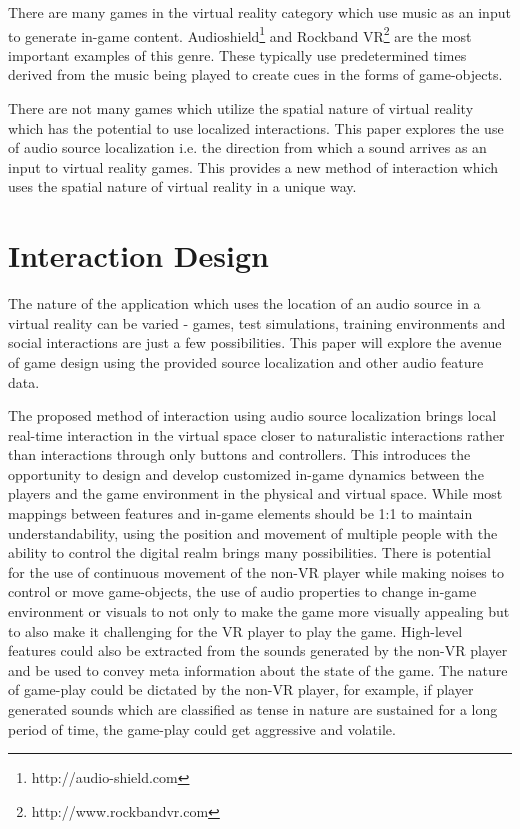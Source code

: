 \documentclass[convention]{aesconf}
\begin{document}
There are many games in the virtual reality category which use music as an input to generate in-game content. Audioshield\footnote{http://audio-shield.com} and Rockband VR\footnote{http://www.rockbandvr.com} are the most important examples of this genre. These typically use predetermined times derived from the music being played to create cues in the forms of game-objects.

There are not many games which utilize the spatial nature of virtual reality which has the potential to use localized interactions. This paper explores the use of audio source localization i.e. the direction from which a sound arrives as an input to virtual reality games. This provides a new method of interaction which uses the spatial nature of virtual reality in a unique way. 

\section{Interaction Design}
The nature of the application which uses the location of an audio source in a virtual reality can be varied - games, test simulations, training environments and social interactions are just a few possibilities. This paper will explore the avenue of game design using the provided source localization and other audio feature data.

The proposed method of interaction using audio source localization brings local real-time interaction in the virtual space closer to naturalistic interactions rather than interactions through only buttons and controllers. This introduces the opportunity to design and develop customized in-game dynamics between the players and the game environment in the physical and virtual space. While most mappings between features and in-game elements should be 1:1 to maintain understandability, using the position and movement of multiple people with the ability to control the digital realm brings many possibilities. There is potential for the use of continuous movement of the non-VR player while making noises to control or move game-objects, the use of audio properties to change in-game environment or visuals to not only to make the game more visually appealing but to also make it challenging for the VR player to play the game. High-level features could also be extracted from the sounds generated by the non-VR player and be used to convey meta information about the state of the game. The nature of game-play could be dictated by the non-VR player, for example, if player generated sounds which are classified as tense in nature are sustained for a long period of time, the game-play could get aggressive and volatile.
\end{document}
